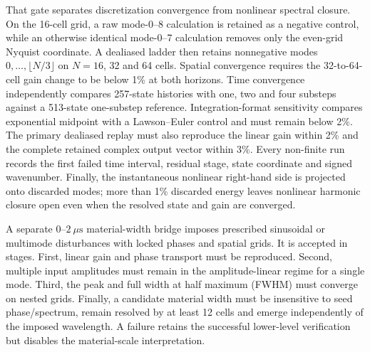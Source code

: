That gate separates discretization convergence from nonlinear spectral
closure.  On the 16-cell grid, a raw mode-0--8 calculation is retained as a
negative control, while an otherwise identical mode-0--7 calculation removes
only the even-grid Nyquist coordinate.  A dealiased ladder then retains
nonnegative modes $0,\ldots,\lfloor N/3\rfloor$ on $N=16$, 32 and 64 cells.
Spatial convergence requires the 32-to-64-cell gain change to be below 1\% at
both horizons.  Time convergence independently compares 257-state histories
with one, two and four substeps against a 513-state one-substep reference.
Integration-format sensitivity compares exponential midpoint with a
Lawson--Euler control and must remain below 2\%.  The primary dealiased replay
must also reproduce the linear gain within 2\% and the complete retained
complex output vector within 3\%.  Every non-finite run records the first
failed time interval, residual stage, state coordinate and signed
wavenumber.  Finally, the instantaneous nonlinear right-hand side is projected
onto discarded modes; more than 1\% discarded energy leaves nonlinear
harmonic closure open even when the resolved state and gain are converged.

A separate $0$--$2~\mu\mathrm s$ material-width bridge imposes prescribed sinusoidal or multimode disturbances with locked phases and spatial grids. It is accepted in stages. First, linear gain and phase transport must be reproduced. Second, multiple input amplitudes must remain in the amplitude-linear regime for a single mode. Third, the peak and full width at half maximum (FWHM) must converge on nested grids. Finally, a candidate material width must be insensitive to seed phase/spectrum, remain resolved by at least 12 cells and emerge independently of the imposed wavelength. A failure retains the successful lower-level verification but disables the material-scale interpretation.
